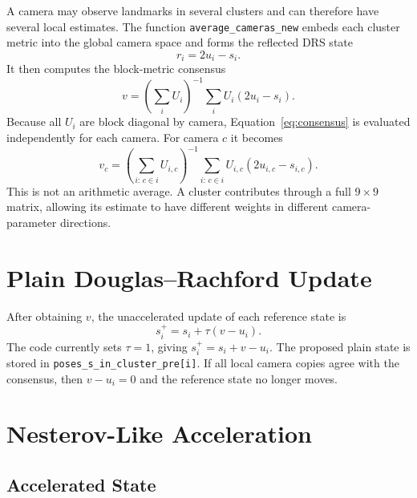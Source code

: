 \documentclass[11pt]{article}
\begin{document}
A camera may observe landmarks in several clusters and can therefore have
several local estimates.  The function \verb|average_cameras_new| embeds each
cluster metric into the global camera space and forms the reflected DRS state
\begin{equation}
  r_i = 2u_i-s_i.
\end{equation}
It then computes the block-metric consensus
\begin{equation}
  v =
  \left(\sum_i U_i\right)^{-1}
  \sum_i U_i(2u_i-s_i).
  \label{eq:consensus}
\end{equation}
Because all $U_i$ are block diagonal by camera, Equation~\eqref{eq:consensus}
is evaluated independently for each camera.  For camera $c$ it becomes
\begin{equation}
  v_c =
  \left(\sum_{i:\,c\in i}U_{i,c}\right)^{-1}
  \sum_{i:\,c\in i}U_{i,c}(2u_{i,c}-s_{i,c}).
\end{equation}
This is not an arithmetic average.  A cluster contributes through a full
$9\times9$ matrix, allowing its estimate to have different weights in
different camera-parameter directions.

\section{Plain Douglas--Rachford Update}

After obtaining $v$, the unaccelerated update of each reference state is
\begin{equation}
  s_i^{+}=s_i+\tau(v-u_i).
  \label{eq:drs-update}
\end{equation}
The code currently sets $\tau=1$, giving $s_i^{+}=s_i+v-u_i$.  The proposed
plain state is stored in \verb|poses_s_in_cluster_pre[i]|.  If all local
camera copies agree with the consensus, then $v-u_i=0$ and the reference
state no longer moves.

\section{Nesterov-Like Acceleration}

\subsection{Accelerated State}
\end{document}
